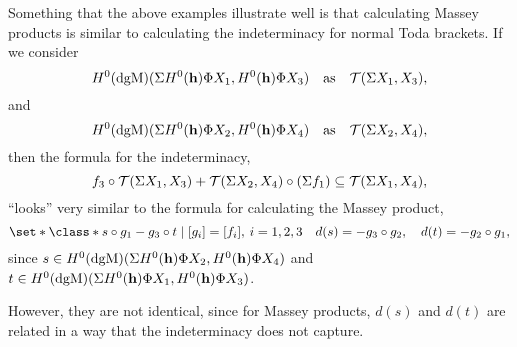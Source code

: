 Something that the above examples illustrate well is that calculating Massey products is similar to calculating the indeterminacy for normal Toda brackets. If we consider
\[
    H^0(\operatorname{dgM})(\Sigma H^0(\mathbf{h}) \Phi X_1, H^0(\mathbf{h}) \Phi X_3) \quad \text{as} \quad {\mathcal{T}}(\Sigma X_1, X_3),
\]
and
\[
    H^0(\operatorname{dgM})(\Sigma H^0(\mathbf{h}) \Phi X_2, H^0(\mathbf{h}) \Phi X_4) \quad \text{as} \quad {\mathcal{T}}(\Sigma X_2, X_4),
\]
then the formula for the indeterminacy,
\[
    f_3 \circ {\mathcal{T}}(\Sigma X_1, X_3)  + {\mathcal{T}}(\Sigma X_2, X_4) \circ (\Sigma f_1) \subseteq {\mathcal{T}}(\Sigma X_1, X_4),
\]
``looks'' very similar to the formula for calculating the Massey product,
\[
    \set*{
        \class*{
            s \circ g_1 - g_3 \circ t
        }
        \mid [g_i] = [f_i], \: i = 1, 2, 3 \quad
        d(s) = - g_3 \circ g_2, \quad
        d(t) = - g_2 \circ g_1
    },
\]
since \( s \in H^0(\operatorname{dgM})(\Sigma H^0(\mathbf{h}) \Phi X_2, H^0(\mathbf{h}) \Phi X_4) \) and \( t \in H^0(\operatorname{dgM})(\Sigma H^0(\mathbf{h}) \Phi X_1, H^0(\mathbf{h}) \Phi X_3) \).

However, they are not identical, since for Massey products, \( d(s) \) and \( d(t) \) are related in a way that the indeterminacy does not capture.